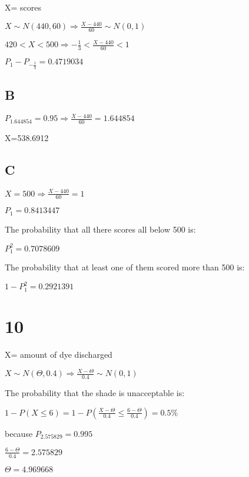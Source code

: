 \documentclass{article}
\begin{document}
	X= scores
	
	$X\sim N(440,60)\Rightarrow \frac{X-440}{60}\sim N(0,1)$
	
	$420<X<500\Rightarrow -\frac{1}{3}<\frac{X-440}{60}<1$
	
	$P_1-P_{-\frac{1}{3}}=0.4719034$
	
	\subsection*{B}
	
	$P_{1.644854}=0.95\Rightarrow \frac{X-440}{60}=1.644854$
	
	X=538.6912
	
	\subsection*{C}
	
	$X=500\Rightarrow \frac{X-440}{60}=1$
	
	$P_1=0.8413447$
	
	The probability that all there scores all below 500 is:
	
	$P_1^2=0.7078609$
	
	The probability that at least one of them scored more than 500 is:
	
	$1-P_1^2=0.2921391$
	
	\section*{10}
	
	X= amount of dye discharged
	
	$X\sim N(\Theta,0.4)\Rightarrow \frac{X-\Theta}{0.4}\sim N(0,1)$
	
	\hspace*{\fill}
	
	The probability that the shade is unacceptable is:
	
	$1-P(X\le 6)=1-P(\frac{X-\Theta}{0.4}\le \frac{6-\Theta}{0.4})=0.5\%$
	
	because $P_{2.575829}=0.995$
	
	$\frac{6-\Theta}{0.4}=2.575829$
	
	$\Theta=4.969668$
	
	
\end{document}
